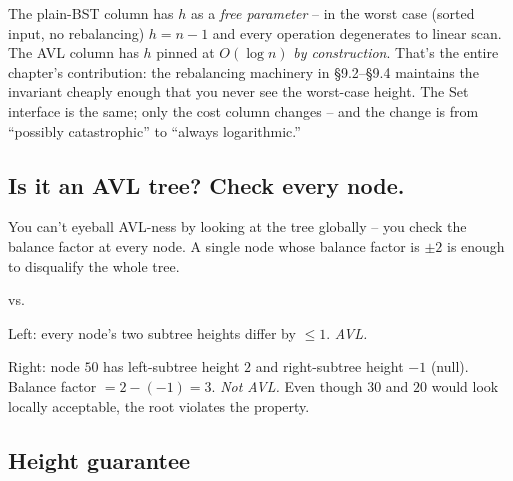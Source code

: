 \documentclass[11pt]{article}
\begin{document}
The plain-BST column has $h$ as a \emph{free parameter} -- in the
worst case (sorted input, no rebalancing) $h = n - 1$ and every
operation degenerates to linear scan. The AVL column has $h$ pinned
at $O(\log n)$ \emph{by construction}. That's the entire chapter's
contribution: the rebalancing machinery in \S9.2--\S9.4 maintains
the invariant cheaply enough that you never see the worst-case
height. The Set interface is the same; only the cost column
changes -- and the change is from ``possibly catastrophic'' to
``always logarithmic.''

\subsection*{Is it an AVL tree? Check every node.}

You can't eyeball AVL-ness by looking at the tree globally -- you check the balance factor at every node. A single node whose balance factor is $\pm 2$ is enough to disqualify the whole tree.

\begin{center}
\quad vs. \quad
{}
\end{center}

Left: every node's two subtree heights differ by $\le 1$. \emph{AVL.}

Right: node $50$ has left-subtree height $2$ and right-subtree height $-1$ (null). Balance factor $= 2 - (-1) = 3$. \emph{Not AVL.} Even though $30$ and $20$ would look locally acceptable, the root violates the property.

\subsection*{Height guarantee}
\end{document}
